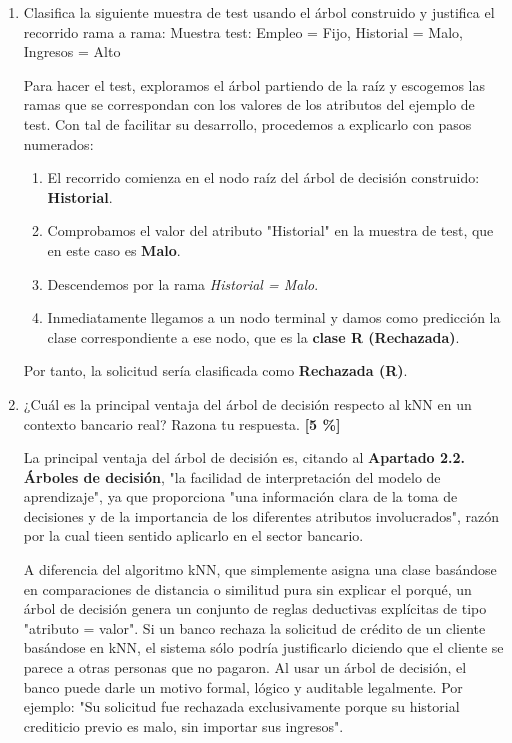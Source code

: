 \documentclass[11pt, a4paper]{article}
\newenvironment{problem}[1][Cuestión]{
	\vspace{0.5cm}
	\noindent{\Large\bfseries #1} \par\vspace{0.5cm}
}{
	\vspace{0.5cm}
}
\begin{document}
\begin{problem}[Descripción de la PEC a realizar]
\begin{problem}[Problema 2 (25 \%)]
\begin{enumerate}[label=\alph*)]
{						Dado que la partición inicial generada por el atributo Historial agrupa todas las muestras en nodos donde la clasificación es exacta, \textbf{no se genera ningún nodo interno} y, por tanto, no es necesario aplicar una segunda iteración al conjunto reducido.
					}

				\item Clasifica la siguiente muestra de test usando el árbol construido y justifica el recorrido rama a rama:
					Muestra test: Empleo = Fijo, Historial = Malo, Ingresos = Alto

						{ \color{blue}
							Para hacer el test, exploramos el árbol partiendo de la raíz y escogemos las ramas que se correspondan con los valores de los atributos del ejemplo de test. Con tal de facilitar su desarrollo, procedemos a explicarlo con pasos numerados:
							\begin{enumerate}[label=\arabic*.]
								\item El recorrido comienza en el nodo raíz del árbol de decisión construido: \textbf{Historial}.
								\item Comprobamos el valor del atributo "Historial" en la muestra de test, que en este caso es \textbf{Malo}.
								\item Descendemos por la rama \textit{Historial = Malo}.
								\item Inmediatamente llegamos a un nodo terminal y damos como predicción la clase correspondiente a ese nodo, que es la \textbf{clase R (Rechazada)}.
							\end{enumerate}
							Por tanto, la solicitud sería clasificada como \textbf{Rechazada (R)}.
						}

				\item ¿Cuál es la principal ventaja del árbol de decisión respecto al kNN en un contexto bancario real? Razona tu respuesta. \textbf{[5 \%]}
					{ \color{blue}
						La principal ventaja del árbol de decisión es, citando al \textbf{Apartado 2.2. Árboles de decisión}, "la facilidad de interpretación del modelo de aprendizaje", ya que proporciona "una información clara de la toma de decisiones y de la importancia de los diferentes atributos involucrados", razón por la cual tieen sentido aplicarlo en el sector bancario. 

						A diferencia del algoritmo kNN, que simplemente asigna una clase basándose en comparaciones de distancia o similitud pura sin explicar el porqué, un árbol de decisión genera un conjunto de reglas deductivas explícitas de tipo "atributo = valor". Si un banco rechaza la solicitud de crédito de un cliente basándose en kNN, el sistema sólo podría justificarlo diciendo que el cliente se parece a otras personas que no pagaron. Al usar un árbol de decisión, el banco puede darle un motivo formal, lógico y auditable legalmente. Por ejemplo: "Su solicitud fue rechazada exclusivamente porque su historial crediticio previo es malo, sin importar sus ingresos".
					}
			\end{enumerate}
		\end{problem}


\end{problem}
\end{document}
